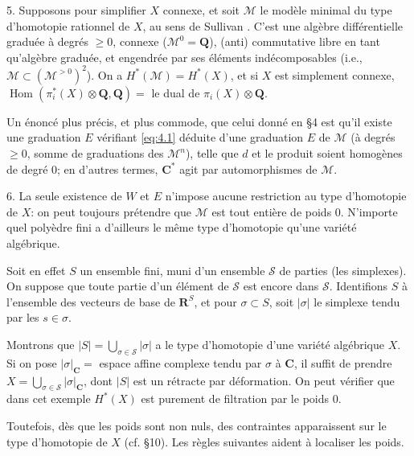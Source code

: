 \documentclass{amsart}
\theoremstyle{plain}
\theoremstyle{definition}
\theoremstyle{remark}
\DeclareMathOperator{\Hom}{Hom}
\begin{document}
5. Supposons pour simplifier $X$ connexe, et soit $\mathscr{M}$ le mod\`ele minimal du type d'homotopie rationnel de $X$, au sens de Sullivan \cite{S}. C'est une alg\`ebre diff\'erentielle gradu\'ee \`a degr\'es $\geq 0$, connexe ($\mathscr{M}^0 = \mathbf{Q}$), (anti) commutative libre en tant qu'alg\`ebre gradu\'ee, et engendr\'ee par ses \'el\'ements ind\'ecomposables (i.e., $\mathscr{M} \subset (\mathscr{M}^{>0})^2$). On a $H^*(\mathscr{M}) = H^*(X)$, et si $X$ est simplement connexe, $\Hom(\pi_i^*(X) \otimes \mathbf{Q}, \mathbf{Q}) =$ le dual de $\pi_i(X) \otimes \mathbf{Q}$.

Un \'enonc\'e plus pr\'ecis, et plus commode, que celui donn\'e en \S 4 est qu'il existe une graduation $E$ v\'erifiant \eqref{eq:4.1} d\'eduite d'une graduation $E$ de $\mathscr{M}$ (\`a degr\'es $\geq 0$, somme de graduations des $\mathscr{M}^n$), telle que $d$ et le produit soient homog\`enes de degr\'e $0$; en d'autres termes, $\mathbf{C}^*$ agit par automorphismes de $\mathscr{M}$.

6. La seule existence de $W$ et $E$ n'impose aucune restriction au type d'homotopie de $X$: on peut toujours pr\'etendre que $\mathscr{M}$ est tout enti\`ere de poids $0$. N'importe quel poly\`edre fini a d'ailleurs le m\^eme type d'homotopie qu'une vari\'et\'e alg\'ebrique.

Soit en effet $S$ un ensemble fini, muni d'un ensemble $\mathscr{S}$ de parties (les simplexes). On suppose que toute partie d'un \'el\'ement de $\mathscr{S}$ est encore dans $\mathscr{S}$. Identifions $S$ \`a l'ensemble des vecteurs de base de $\mathbf{R}^S$, et pour $\sigma \subset S$, soit $|\sigma|$ le simplexe tendu par les $s \in \sigma$.

Montrons que $|S| = \bigcup_{\sigma \in \mathscr{S}} |\sigma|$ a le type d'homotopie d'une vari\'et\'e alg\'ebrique $X$. Si on pose $|\sigma|_\mathbf{C} =$ espace affine complexe tendu par $\sigma$ \`a $\mathbf{C}$, il suffit de prendre $X = \bigcup_{\sigma \in \mathscr{S}} |\sigma|_\mathbf{C}$, dont $|S|$ est un r\'etracte par d\'eformation. On peut v\'erifier que dans cet exemple $H^*(X)$ est purement de filtration par le poids $0$.

Toutefois, d\`es que les poids sont non nuls, des contraintes apparaissent sur le type d'homotopie de $X$ (cf. \S 10). Les r\`egles suivantes aident \`a localiser les poids.
\end{document}
